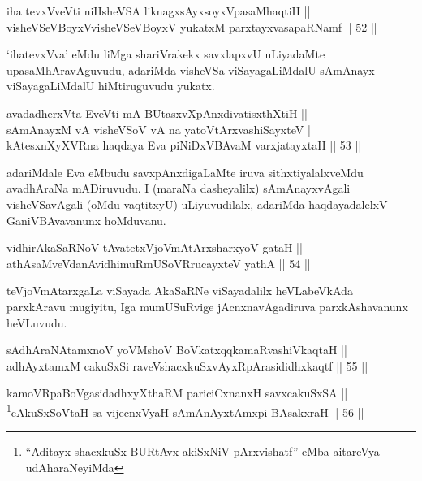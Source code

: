 \begin{shl}
iha tevxVveVti niHsheVSA liknagxsAyxsoyxVpasaMhaqtiH || \\
visheVSeVBoyxV\s visheVSeVBoyxV yukatxM parxtayxvasapaRNamf \hfill || 52 ||  
\end{shl}

\begin{artha}
`ihatevxVva' eMdu liMga shariVrakekx savxlapxvU uLiyadaMte
upasaMhAravAguvudu, adariMda visheVSa viSayagaLiMdalU sAmAnayx
viSayagaLiMdalU hiMtiruguvudu yukatx.
\end{artha}


\begin{shl}
avadadherxV\s ta EveVti mA BUtasxvXpAnxdivatisxthXtiH || \\
sAmAnayxM vA visheVSoV vA na yatoV\s tArxvashiSayxteV || \\
kAtesxnXyXVRna haqdaya Eva piNiDxVBAvaM varxjatayxtaH \hfill || 53 ||  
\end{shl}

\begin{artha}
adariMdale Eva eMbudu savxpAnxdigaLaMte iruva sithxtiyalalxveMdu
avadhAraNa mADiruvudu. I (maraNa dasheyalilx) sAmAnayxvAgali
visheVSavAgali (oMdu vaqtitxyU) uLiyuvudilalx, adariMda haqdayadalelxV
GaniVBAvavanunx hoMduvanu.
\end{artha}


\begin{shl}
vidhirAkaSaRNoV tAvatetxVjoVmAtArxsharxyoV gataH || \\
athAsaMveVdanAvidhimuRmUSoVRrucayxteV yathA \hfill || 54 ||  
\end{shl}

\begin{artha}
teVjoVmAtarxgaLa viSayada AkaSaRNe viSayadalilx heVLabeVkAda
parxkAravu mugiyitu, Iga mumUSuRvige jAcnxnavAgadiruva parxkAshavanunx heVLuvudu.
\end{artha}


\begin{shl}
sAdhAraNAtamxnoV yoVM\s shoV BoVkatxqqkamaRvashiVkaqtaH || \\
adhAyxtamxM cakuSxSi raveVshacxkuSxvAyxRpArasididhxkaqtf \hfill || 55 ||  
\end{shl}

\begin{shl}
kamoVRpaBoVgasidadhxyXthaRM pariciCxnanxH savxcakuSxSA || \\
\footnote{``Aditayx shacxkuSx BURtAvx akiSxNiV pArxvishatf'' eMba aitareVya udAharaNeyiMda}cAkuSxSoV\s taH sa vijecnxVyaH sAmAnAyxtAmx\s pi BAsakxraH \hfill || 56 ||  
\end{shl}


